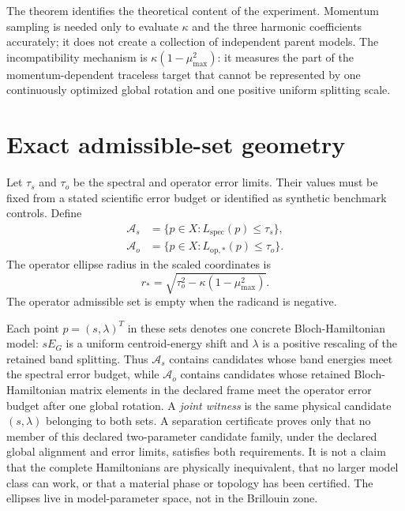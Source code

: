 \documentclass[11pt]{article}
\begin{document}
The theorem identifies the theoretical content of the experiment. Momentum sampling is
needed only to evaluate $\kappa$ and the three harmonic coefficients accurately; it does
not create a collection of independent parent models. The incompatibility mechanism is
$\kappa(1-\mu_{\max}^2)$: it measures the part of the momentum-dependent traceless target
that cannot be represented by one continuously optimized global rotation and one
positive uniform splitting scale.

\section{Exact admissible-set geometry}

Let $\tau_s$ and $\tau_o$ be the spectral and operator error limits. Their values must be
fixed from a stated scientific error budget or identified as synthetic benchmark
controls. Define
\begin{align}
 \mathcal A_s
 &=\{p\in X:L_{\mathrm{spec}}(p)\le\tau_s\},\\
 \mathcal A_o
 &=\{p\in X:L_{\mathrm{op},*}(p)\le\tau_o\}.
 \label{eq:admissible-sets}
\end{align}
The operator ellipse radius in the scaled coordinates is
\begin{equation}
 r_*=
 \sqrt{\tau_o^2-\kappa(1-\mu_{\max}^2)}.
 \label{eq:operator-radius}
\end{equation}
The operator admissible set is empty when the radicand is negative.

Each point $p=(s,\lambda)^T$ in these sets denotes one concrete Bloch-Hamiltonian model:
$sE_G$ is a uniform centroid-energy shift and $\lambda$ is a positive rescaling of the
retained band splitting. Thus $\mathcal A_s$ contains candidates whose band energies
meet the spectral error budget, while $\mathcal A_o$ contains candidates whose retained
Bloch-Hamiltonian matrix elements in the declared frame meet the operator error budget
after one global rotation. A \emph{joint witness} is the same physical candidate
$(s,\lambda)$ belonging to both sets. A separation certificate proves only that no member
of this declared two-parameter candidate family, under the declared global alignment and
error limits, satisfies both requirements. It is not a claim that the complete
Hamiltonians are physically inequivalent, that no larger model class can work, or that a
material phase or topology has been certified. The ellipses live in model-parameter
space, not in the Brillouin zone.
\end{document}
